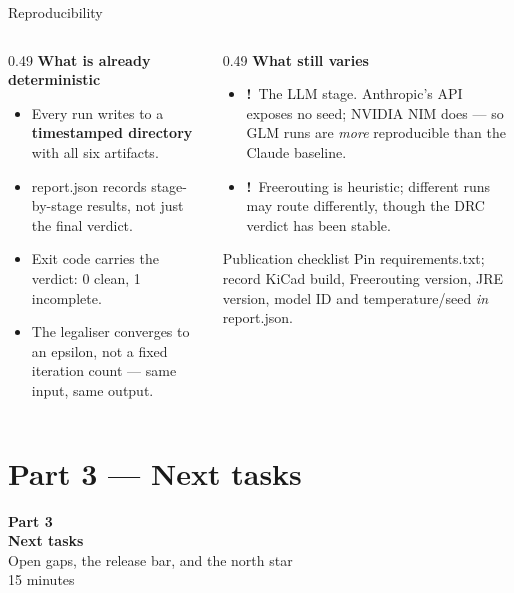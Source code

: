 \documentclass[aspectratio=169,10pt]{beamer}
\newcommand{\gap}{{\color{stamber}\textbf{!}}}
\newcommand{\code}[1]{{\ttfamily\small #1}}
\begin{document}
\begin{frame}{Reproducibility}
\vspace{2mm}
\begin{columns}[T]
\begin{column}{0.49\textwidth}
\textbf{What is already deterministic}
\begin{itemize}\small
  \item Every run writes to a \textbf{timestamped directory} with all six artifacts.
  \item \code{report.json} records stage-by-stage results, not just the final verdict.
  \item Exit code carries the verdict: \code{0} clean, \code{1} incomplete.
  \item The legaliser converges to an epsilon, not a fixed iteration count --- same input, same output.
\end{itemize}
\end{column}
\begin{column}{0.49\textwidth}
\textbf{What still varies}
\begin{itemize}\small
  \item \gap\ The LLM stage. Anthropic's API exposes no seed; NVIDIA NIM does --- so GLM runs are \emph{more} reproducible than the Claude baseline.
  \item \gap\ Freerouting is heuristic; different runs may route differently, though the DRC verdict has been stable.
\end{itemize}
\vspace{2mm}
\begin{block}{Publication checklist}
\small
Pin \code{requirements.txt}; record KiCad build, Freerouting version, JRE version, model ID and temperature/seed \emph{in} \code{report.json}.
\end{block}
\end{column}
\end{columns}
\end{frame}

\section{Part 3 --- Next tasks}
{
\begin{frame}[plain]
\vfill
\begin{center}
{\color{stcyan}\Large\textbf{Part 3}}\\[6pt]
{\color{white}\LARGE\textbf{Next tasks}}\\[10pt]
{\color{white}\small Open gaps, the release bar, and the north star}\\[4pt]
{\color{stcyan}\footnotesize 15 minutes}
\end{center}
\vfill
\end{frame}}
\end{document}
